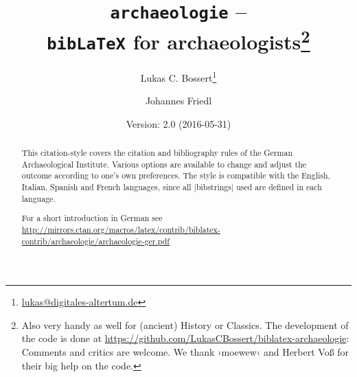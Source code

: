 \documentclass[a4paper,
10pt,
greek,
french,
spanish,
italian,
ngerman,
english
]{ltxdoc}
\begin{document}
\title{\texttt{archaeologie} -- \\\texttt{bib\LaTeX} for archaeologists\footnote{Also very handy as well for (ancient) History or Classics.
The development of the code is done at \url{https://github.com/LukasCBossert/biblatex-archaeologie}: 
Comments and critics are welcome.
We thank  ›moewew‹ and Herbert Voß for their big help on the code.%
}}
\author{Lukas C. Bossert\thanks{\href{mailto:lukas@digitales-altertum.de}{lukas@digitales-altertum.de}} \and Johannes Friedl}
\date{Version: 2.0 (2016-05-31)}
 \maketitle
 \begin{abstract}
\noindent This citation-style covers the citation and bibliography rules of the German Archaeological Institute. 
Various options are available to change and adjust the outcome according to one's own preferences. 
The style is compatible with the English, Italian, Spanish and French languages, since all |bibstrings| used are defined in each language.

For a short introduction in German see \url{http://mirrors.ctan.org/macros/latex/contrib/biblatex-contrib/archaeologie/archaeologie-ger.pdf}
 \end{abstract}


\begin{multicols}{2}
\footnotesize\parskip=0mm \tableofcontents
\end{multicols}
\end{document}
